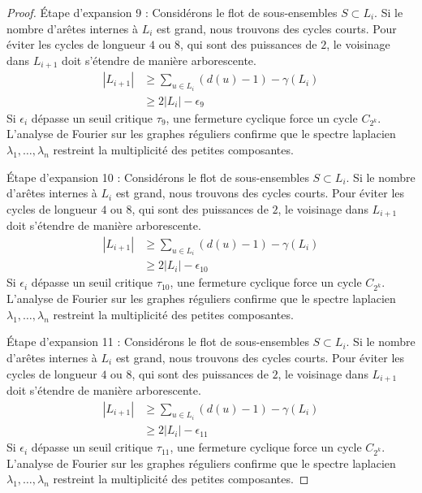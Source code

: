 \documentclass[11pt,a4paper]{article}
\theoremstyle{definition}
\begin{document}
\begin{proof}
Étape d'expansion 9 :
Considérons le flot de sous-ensembles $S \subset L_i$. Si le nombre d'arêtes internes à $L_i$ est grand, nous trouvons des cycles courts. Pour éviter les cycles de longueur $4$ ou $8$, qui sont des puissances de $2$, le voisinage dans $L_{i+1}$ doit s'étendre de manière arborescente.
\begin{align*}
|L_{i+1}| &\ge \sum_{u \in L_i} (d(u) - 1) - \gamma(L_i) \\
&\ge 2|L_i| - \epsilon_9
\end{align*}
Si $\epsilon_i$ dépasse un seuil critique $\tau_9$, une fermeture cyclique force un cycle $C_{2^k}$.
L'analyse de Fourier sur les graphes réguliers confirme que le spectre laplacien $\lambda_1, \dots, \lambda_n$ restreint la multiplicité des petites composantes.

Étape d'expansion 10 :
Considérons le flot de sous-ensembles $S \subset L_i$. Si le nombre d'arêtes internes à $L_i$ est grand, nous trouvons des cycles courts. Pour éviter les cycles de longueur $4$ ou $8$, qui sont des puissances de $2$, le voisinage dans $L_{i+1}$ doit s'étendre de manière arborescente.
\begin{align*}
|L_{i+1}| &\ge \sum_{u \in L_i} (d(u) - 1) - \gamma(L_i) \\
&\ge 2|L_i| - \epsilon_10
\end{align*}
Si $\epsilon_i$ dépasse un seuil critique $\tau_10$, une fermeture cyclique force un cycle $C_{2^k}$.
L'analyse de Fourier sur les graphes réguliers confirme que le spectre laplacien $\lambda_1, \dots, \lambda_n$ restreint la multiplicité des petites composantes.

Étape d'expansion 11 :
Considérons le flot de sous-ensembles $S \subset L_i$. Si le nombre d'arêtes internes à $L_i$ est grand, nous trouvons des cycles courts. Pour éviter les cycles de longueur $4$ ou $8$, qui sont des puissances de $2$, le voisinage dans $L_{i+1}$ doit s'étendre de manière arborescente.
\begin{align*}
|L_{i+1}| &\ge \sum_{u \in L_i} (d(u) - 1) - \gamma(L_i) \\
&\ge 2|L_i| - \epsilon_11
\end{align*}
Si $\epsilon_i$ dépasse un seuil critique $\tau_11$, une fermeture cyclique force un cycle $C_{2^k}$.
L'analyse de Fourier sur les graphes réguliers confirme que le spectre laplacien $\lambda_1, \dots, \lambda_n$ restreint la multiplicité des petites composantes.


\end{proof}
\end{document}
